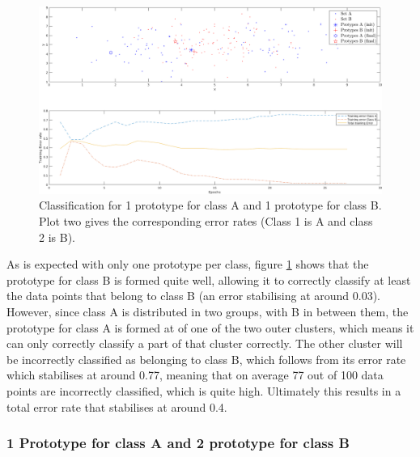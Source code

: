 \documentclass[10pt]{article}
\begin{document}
\begin{figure}[H]
 \centering
 \includegraphics[width=\textwidth]{Fig12_a1.png}
 \caption{Classification for 1 prototype for class A and 1 prototype for class B. Plot two gives the corresponding error rates (Class 1 is A and class 2 is B).}
 \label{fig1.12a}
\end{figure}
As is expected with only one prototype per class, figure \ref{fig1.12a} shows that the prototype for class B is formed quite well, allowing it to correctly classify at least the data points that belong to class B (an error stabilising at around 0.03). However, since class A is distributed in two groups, with B in between them, the prototype for class A is formed at of one of the two outer clusters, which means it can only correctly classify a part of that cluster correctly. The other cluster will be incorrectly classified as belonging to class B, which follows from its error rate which stabilises at around 0.77, meaning that on average 77 out of 100 data points are incorrectly classified, which is quite high. Ultimately this results in a total error rate that stabilises at around 0.4.

\subsubsection{1 Prototype for class A and 2 prototype for class B}
\end{document}
